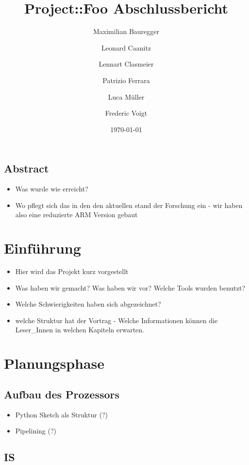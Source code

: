 \documentclass[paper=a4,fontsize=12pt]{scrreprt}
\title{Project::Foo Abschlussbericht}
\author{Maximilian Bauregger \and Leonard Caanitz \and Lennart Clasmeier \and Patrizio Ferrara \and Luca Müller \and Frederic Voigt}
\date{\today}
\begin{document}
\maketitle

\tableofcontents

\section*{Abstract}

\begin{itemize}
    \item Was wurde wie erreicht?
    \item Wo pflegt sich das in den den aktuellen stand der Forschung ein - wir haben also eine reduzierte ARM Version gebaut
\end{itemize}


\chapter{Einführung}
\begin{itemize}
    \item Hier wird das Projekt kurz vorgestellt
    \item Was haben wir gemacht? Was haben wir vor? Welche Tools wurden benutzt?
    \item Welche Schwierigkeiten haben sich abgezeichnet?
    \item welche Struktur hat der Vortrag - Welche Informationen können die Leser\_Innen in welchen Kapiteln erwarten.
\end{itemize}

\chapter{Planungsphase}

\section{Aufbau des Prozessors}

\begin{itemize}
    \item Python Sketch als Struktur (?)
    \item Pipelining (?)
\end{itemize}

\section{IS}
\end{document}
